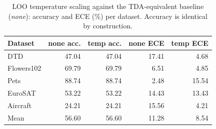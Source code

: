 \begin{table}[htbp]
\centering
\begin{tabular}{lrrrr}
\toprule
Dataset & none acc. & temp acc. & none ECE & temp ECE \\
\midrule
DTD & 47.04 & 47.04 & 17.41 & 4.68 \\
Flowers102 & 69.79 & 69.79 & 6.51 & 4.85 \\
Pets & 88.74 & 88.74 & 2.48 & 15.54 \\
EuroSAT & 53.22 & 53.22 & 14.43 & 13.43 \\
Aircraft & 24.21 & 24.21 & 15.56 & 4.21 \\
Mean & 56.60 & 56.60 & 11.28 & 8.54 \\
\bottomrule
\end{tabular}
\caption{LOO temperature scaling against the TDA-equivalent baseline (\emph{none}): accuracy and ECE (\%) per dataset. Accuracy is identical by construction.}
\label{tab:temp}
\end{table}
